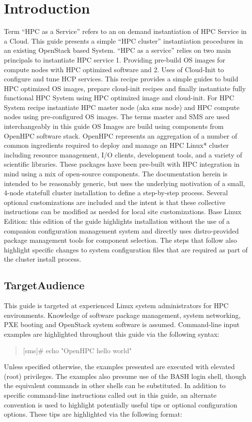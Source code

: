 \documentclass[12pt]{article}
\begin{document}
\section*{Introduction}

Term “HPC as a Service” refers to an on demand instantiation of HPC Service in a Cloud. This guide presents a simple “HPC cluster” instantiation procedures in an existing OpenStack based System. “HPC as a service” relies on two main principals to instantiate HPC service 1. Providing pre-build OS images for compute nodes with HPC optimized software and 2. Uses of Cloud-Init to configure and tune HCP services. This recipe provides a simple guides to build HPC optimized OS images, prepare cloud-init recipes and finally instantiate fully functional HPC System using HPC optimized image and cloud-init. For HPC System recipe instantiate HPC master node (aka sms node) and HPC compute nodes using pre-configured OS images. The terms master and SMS are used interchangeably in this guide
OS Images are build using components from OpenHPC software stack. OpenHPC represents an aggregation of a number of common ingredients required to deploy and manage an HPC Linux* cluster including resource management, I/O clients, development tools, and a variety of scientific libraries. These packages have been pre-built with HPC integration in mind using a mix of open-source components. The documentation herein is intended to be reasonably generic,
but uses the underlying motivation of a small, 4-node statefull cluster installation to define a step-by-step
process. Several optional customizations are included and the intent is that these collective instructions can
be modified as needed for local site customizations.
Base Linux Edition: this edition of the guide highlights installation without the use of a companion configuration management system and directly uses distro-provided package management tools for component selection. The steps that follow also highlight specific changes to system configuration files that are required as part of the cluster install process.


\subsection*{TargetAudience}
This guide is targeted at experienced Linux system administrators for HPC environments. Knowledge of
software package management, system networking, PXE booting and OpenStack system software is assumed. Command-line input examples are highlighted throughout this guide via the following syntax:
\begin{quote} 
[sms]\# echo "OpenHPC hello world"

\end{quote}
Unless specified otherwise, the examples presented are executed with elevated (root) privileges. The
examples also presume use of the BASH login shell, though the equivalent commands in other shells can
be substituted. In addition to specific command-line instructions called out in this guide, an alternate
convention is used to highlight potentially useful tips or optional configuration options. These tips are
highlighted via the following format:
\end{document}
